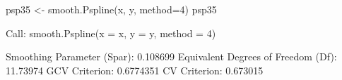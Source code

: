 \begin{Schunk}
\begin{Sinput}
 psp35 <- smooth.Pspline(x, y, method=4)
 psp35
\end{Sinput}
\begin{Soutput}
Call:
smooth.Pspline(x = x, y = y, method = 4)

Smoothing Parameter (Spar): 0.108699 
Equivalent Degrees of Freedom (Df): 11.73974 
GCV Criterion: 0.6774351 
CV  Criterion: 0.673015 
\end{Soutput}
\end{Schunk}
